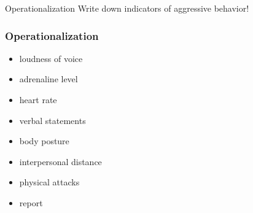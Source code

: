 \documentclass[]{beamer}
\begin{document}
\begin{frame}
\begin{exampleblock}{Operationalization}
Write down indicators of aggressive behavior!
\end{exampleblock}
\end{frame}

\begin{frame}
\frametitle{Operationalization}
\begin{itemize}
\item loudness of voice
\item adrenaline level
\item heart rate
\item verbal statements
\item body posture
\item interpersonal distance
\item physical attacks
\item report 
\end{itemize}
\end{frame}

% 
% 
\end{document}
